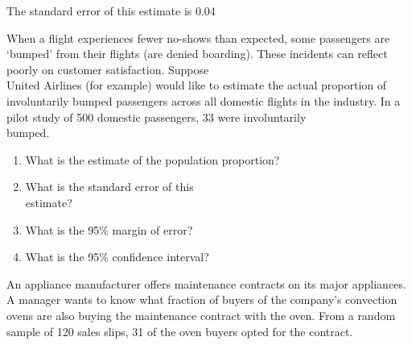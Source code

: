 \documentclass[11pt, chapterprefix=true]{scrbook}\usepackage[]{graphicx}\usepackage[]{color}
\begin{document}
\begin{exercises}
\begin{solution}
The standard error of this estimate is 0.04

\end{solution}

\begin{exercise} %

When a flight experiences fewer no-shows than expected, some passengers are `bumped' from their flights (are denied boarding).  These incidents can reflect poorly on customer satisfaction.  Suppose \\ United Airlines (for example) would like to estimate the actual proportion of involuntarily bumped passengers across all domestic flights in the industry.  In a pilot study of 500 domestic passengers, 33 were involuntarily  \\ bumped.

\begin{enumerate}
\item	What is the estimate of the population proportion?
\item	What is the standard error of this \\ estimate?
\item	What is the 95\% margin of error?
\item	What is the 95\% confidence interval?
\end{enumerate}
\end{exercise}
%

\begin{exercise} %

An appliance manufacturer offers maintenance contracts on its major appliances.  A manager wants to know what fraction of buyers of the company's convection ovens are also buying the maintenance contract with the oven.  From a random sample of 120 sales slips, 31 of the oven buyers opted for the contract.


\end{exercise}
\end{exercises}
\end{document}
